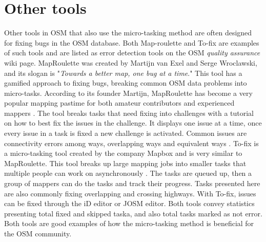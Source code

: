 \section{Other tools}
Other tools in OSM that also use the micro-tasking method are often designed for fixing bugs in the OSM database. Both Map-roulette and To-fix are examples of such tools and are listed as error detection tools on the OSM \textit{quality assurance} wiki page. MapRoulette was created by Martijn van Exel and Serge Wroclawski, and its slogan is "\textit{Towards a better map, one bug at a time}." This tool has a gamified approach to fixing bugs, breaking common OSM data problems into micro-tasks. According to its founder Martijn, MapRoulette has become a very popular mapping pastime for both amateur contributors and experienced mappers \cite{Exelvan2013}.  The tool breaks tasks that need fixing into challenges with a tutorial on how to best fix the issues in the challenge. It displays one issue at a time, once every issue in a task is fixed a new challenge is activated. Common issues are connectivity errors among ways, overlapping ways and equivalent ways \cite{OpenStreetMapk}. To-fix is a micro-tasking tool created by the company Mapbox and is very similar to MapRoulette. This tool breaks up large mapping jobs into smaller tasks that multiple people can work on asynchronously \cite{Lidman2014}. The tasks are queued up, then a group of mappers can do the tasks and track their progress. Tasks presented here are also commonly fixing overlapping and crossing highways. With To-fix, issues can be fixed through the iD editor or JOSM editor. Both tools convey statistics presenting total fixed and skipped taska, and also total tasks marked as not error. Both tools are good examples of how the micro-tasking method is beneficial for the OSM community. 